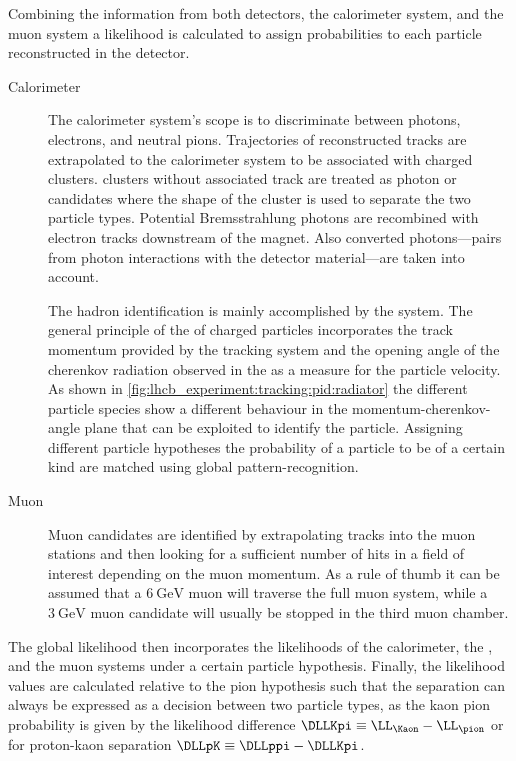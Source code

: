 Combining the information from both \RICH detectors, the calorimeter system, and
the muon system a likelihood is calculated to assign \PID probabilities to each
particle reconstructed in the detector.
%
\begin{description}
  \item[Calorimeter \PID] The calorimeter system's scope is to discriminate
  between photons, electrons, and neutral pions. Trajectories of reconstructed
  tracks are extrapolated to the calorimeter system to be associated with
  charged clusters. \ECAL clusters without associated track are treated as
  photon or \piz candidates where the shape of the cluster is used to separate
  the two particle types. Potential Bremsstrahlung photons are recombined with
  electron tracks downstream of the magnet. Also converted photons---\elel pairs
  from photon interactions with the detector material---are taken into account.
  \item[\RICH \PID] The hadron identification is mainly accomplished by the
  \RICH system. The general principle of the \RICH \PID of charged particles
  incorporates the track momentum provided by the tracking system and the
  opening angle of the cherenkov radiation observed in the \RICH as a measure
  for the particle velocity. As shown in
  \cref{fig:lhcb_experiment:tracking:pid:radiator} the different particle
  species show a different behaviour in the momentum-cherenkov-angle plane that
  can be exploited to identify the particle. Assigning different particle
  hypotheses the probability of a particle to be of a certain kind are matched
  using global pattern-recognition.
  \item[Muon \PID] Muon candidates are identified by extrapolating tracks into
  the muon stations and then looking for a sufficient number of hits in a field
  of interest depending on the muon momentum. As a rule of thumb it can be
  assumed that a $\SI{6}{\GeV}$ muon will traverse the full muon system, while
  a $\SI{3}{\GeV}$ muon candidate will usually be stopped in the third muon
  chamber.
\end{description}
%
The global \PID likelihood then incorporates the likelihoods of the calorimeter,
the \RICH, and the muon systems under a certain particle hypothesis. Finally,
the likelihood values are calculated relative to the pion hypothesis such that
the separation can always be expressed as a decision between two particle types, as
\eg the kaon \vs pion probability is given by the likelihood difference $\DLLKpi
\equiv \LL_{\Kaon} - \LL_{\pion}$ or for proton-kaon separation $\DLLpK \equiv
\DLLppi - \DLLKpi$.


